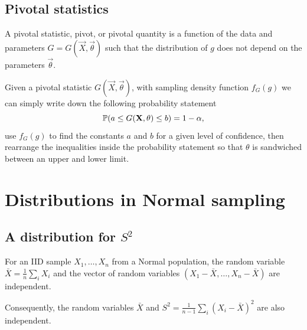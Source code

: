 \documentclass[10pt, a4paper]{article}
\begin{document}
\subsection{Pivotal statistics}

\begin{definition}
    A pivotal statistic,
    pivot,
    or pivotal quantity is a function of the data and parameters $G = G(\vec{X}, \vec{\theta})$ such that the distribution of $g$ does not depend on the parameters $\vec{\theta}$.
\end{definition}

Given a pivotal statistic $G(\vec{X}, \vec{\theta})$,
with sampling density function $f_{G}(g)$ we can simply write down the following probability statement
\[
\P(a \leq G(\vec{X}, \vec{\theta}) \leq b) = 1 - \alpha,
\]
use $f_{G}(g)$ to find the constants $a$ and $b$ for a given level of confidence,
then rearrange the inequalities inside the probability statement so that $\theta$ is sandwiched between an upper and lower limit.

\newpage

\section{Distributions in Normal sampling}

\subsection{A distribution for $S ^ 2$}

\begin{proposition}
    For an IID sample $X_1, \dotsc, X_n$ from a Normal population,
    the random variable $\bar{X} = \frac{1}{n}\sum_{i}X_i$ and the vector of random variables $(X_1 - \bar{X}, \dotsc, X_n - \bar{X})$ are independent.

    Consequently,
    the random variables $\bar{X}$ and $S ^ 2 = \frac{1}{n - 1}\sum_{i}(X_i - \bar{X}) ^ 2$ are also independent.
\end{proposition}
\end{document}
